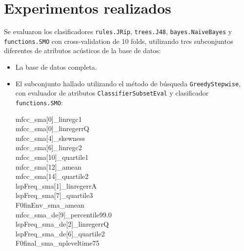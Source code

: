 \documentclass[10pt,a4paper]{article}
\begin{document}
\section{Experimentos realizados}

Se evaluaron los clasificadores \texttt{rules.JRip}, \texttt{trees.J48}, \texttt{bayes.NaiveBayes} y \texttt{functions.SMO} con cross-validation de 10 folds, utilizando tres subconjuntos diferentes de atributos acústicos de la base de datos:

\begin{itemize}
  \item La base de datos completa.
  
  \item El subconjunto hallado utilizando el método de búsqueda \texttt{GreedyStepwise}, con evaluador de atributos \texttt{ClassifierSubsetEval} y clasificador \texttt{functions.SMO}:
  \begin{description}
    \item[mfcc\_sma{[}0{]}\_linregc1]
    \item[mfcc\_sma{[}0{]}\_linregerrQ]
    \item[mfcc\_sma{[}4{]}\_skewness]
    \item[mfcc\_sma{[}6{]}\_linregc2]
    \item[mfcc\_sma{[}10{]}\_quartile1]
    \item[mfcc\_sma{[}12{]}\_amean]
    \item[mfcc\_sma{[}14{]}\_quartile2]
    \item[lspFreq\_sma{[}1{]}\_linregerrA]
    \item[lspFreq\_sma{[}7{]}\_quartile3]
    \item[F0finEnv\_sma\_amean]
    \item[mfcc\_sma\_de{[}9{]}\_percentile99.0]
    \item[lspFreq\_sma\_de{[}2{]}\_linregerrQ]
    \item[lspFreq\_sma\_de{[}6{]}\_quartile2]
    \item[F0final\_sma\_upleveltime75]
  \end{description}    
  

\end{itemize}
\end{document}
